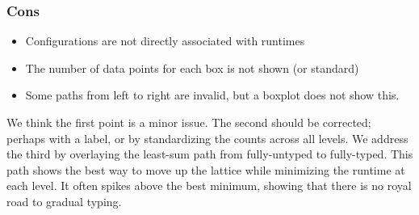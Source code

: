 \documentclass{article}
\begin{document}
\subsubsection*{Cons}
\begin{itemize}
\item
  Configurations are not directly associated with runtimes
\item
  The number of data points for each box is not shown (or standard)
\item
  Some paths from left to right are invalid, but a boxplot does not show this.
\end{itemize}
We think the first point is a minor issue.
The second should be corrected; perhaps with a label, or by standardizing the counts across all levels.
We address the third by overlaying the least-sum path from fully-untyped to fully-typed.
This path shows the best way to move up the lattice while minimizing the runtime at each level.
It often spikes above the best minimum, showing that there is no royal road to gradual typing.
\end{document}
